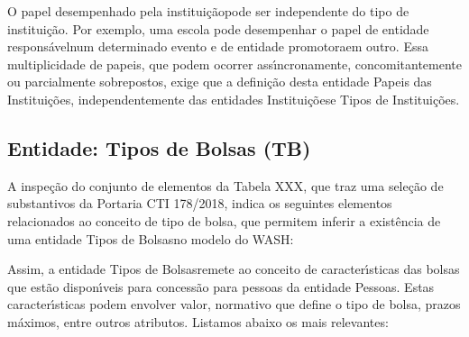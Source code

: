 \documentclass[
12pt,		%
openright,	%
twoside,  %
a4paper,			%
chapter=TITLE,		%
english,			%
french,				%
spanish,			%
brazil				%
]{USPSC-classe/USPSC}
\begin{document}
O \textquotedbl papel desempenhado pela institui\c{c}\~ao\textquotedbl  pode ser independente do \textquotedbl tipo de institui\c{c}\~ao\textquotedbl . Por exemplo, uma escola pode desempenhar o papel de \textquotedbl entidade respons\'avel\textquotedbl  num determinado evento e de \textquotedbl entidade promotora\textquotedbl  em outro. Essa multiplicidade de papeis, que podem ocorrer ass\'{\i}ncronamente, concomitantemente ou parcialmente sobrepostos, exige que a defini\c{c}\~ao desta entidade \textquotedbl Papeis das Institui\c{c}\~oes\textquotedbl , independentemente das entidades \textquotedbl Institui\c{c}\~oes\textquotedbl  e \textquotedbl Tipos de Institui\c{c}\~oes\textquotedbl .









\subsection[Entidade: Tipos de Bolsas (TB)]{Entidade: Tipos de Bolsas (TB)}\label{Entidade: Tipos de Bolsas (TB)}
A inspe\c{c}\~ao do conjunto de elementos da Tabela XXX, que traz uma sele\c{c}\~ao de substantivos da Portaria CTI 178/2018, indica os seguintes elementos relacionados ao conceito de \textquotedbl tipo de bolsa\textquotedbl , que permitem inferir a exist\^encia de uma entidade \textquotedbl Tipos de Bolsas\textquotedbl  no modelo do WASH:










\noindent\begin{center}\mbox{\centering{}}\end{center}


Assim, a entidade \textquotedbl Tipos de Bolsas\textquotedbl  remete ao conceito de caracter\'{\i}sticas das bolsas que est\~ao dispon\'{\i}veis para concess\~ao para pessoas da entidade \textquotedbl Pessoas\textquotedbl . Estas caracter\'{\i}sticas podem envolver valor, normativo que define o tipo de bolsa, prazos m\'aximos, entre outros atributos. Listamos abaixo os mais relevantes:
\end{document}
